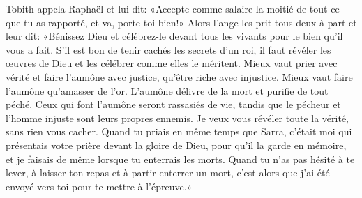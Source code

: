 Tobith appela Raphaël et lui dit:
	«Accepte comme salaire la moitié de tout ce que tu as rapporté,
	et va, porte-toi bien!»
Alors l’ange les prit tous deux à part et leur dit:
	«Bénissez Dieu et célébrez-le devant tous les vivants
		pour le bien qu’il vous a fait.
S’il est bon de tenir cachés les secrets d’un roi,
	il faut révéler les œuvres de Dieu et les célébrer comme elles le méritent.
Mieux vaut prier avec vérité et faire l’aumône avec justice,
	qu’être riche avec injustice.
Mieux vaut faire l’aumône qu’amasser de l’or.
	L’aumône délivre de la mort et purifie de tout péché.
Ceux qui font l’aumône seront rassasiés de vie,
	tandis que le pécheur et l’homme injuste sont leurs propres ennemis.
Je veux vous révéler toute la vérité, sans rien vous cacher.
Quand tu priais en même temps que Sarra,
	c’était moi qui présentais votre prière devant la gloire de Dieu,
		pour qu’il la garde en mémoire,
	et je faisais de même lorsque tu enterrais les morts.
Quand tu n’as pas hésité à te lever,
		à laisser ton repas et à partir enterrer un mort,
	c’est alors que j’ai été envoyé vers toi pour te mettre à l’épreuve.»
